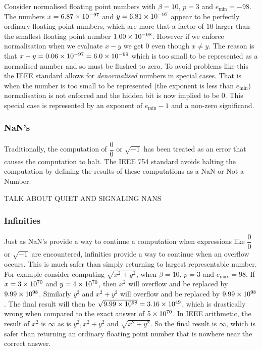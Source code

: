 Consider normalised floating point numbers with $\beta=10$, $p=3$ and
$e_{\text{min}}=-98$. The numbers $x=6.87 \times  10^{-97}  $ and
$y=6.81 \times  10^{-97}  $ appear to be perfectly ordinary floating point numbers,
which are more that a factor of $10$ larger than the smallest floating point
number $1.00 \times  10^{-98}  $. However if we enforce normalisation when we
evaluate $x-y$ we get $0$ even though $x\neq y$. The reason is that
$x-y=0.06 \times  10^{-97}  =6.0 \times  10^{-99}  $ which is too small to be represented as
a normalised number and so must be flushed to zero. To avoid problems like
this the IEEE standard allows for \emph{denormalised} numbers in special
cases. That is when the number is too small to be represented (\ie the
exponent is less than $e_{\text{min}}$) normalisation is not enforced and the
hidden bit is now implied to be $0$. This special case is represented by an
exponent of $e_{\text{min}}-1$ and a non-zero significand.

\subsubsection{NaN's}

Traditionally, the computation of $\dfrac{0}{0}$ or $\sqrt{-1}$ has been
treated as an error that causes the computation to halt. The IEEE 754 standard
avoids halting the computation by defining the results of these computations as
a NaN or Not a Number.

TALK ABOUT QUIET AND SIGNALING NANS

\subsubsection{Infinities}

Just as NaN's provide a way to continue a computation when expressions like
$\dfrac{0}{0}$ or $\sqrt{-1}$ are encountered, infinities provide a way to
continue when an overflow occurs. This is much safer than simply returning to
largest representable number. For example consider computing
$\sqrt{x^{2}+y^{2}}$, when $\beta=10$, $p=3$ and $e_{\text{max}}=98$. If
$x=3 \times  10^{70}  $ and $y=4 \times  10^{70}  $, then $x^{2}$ will overflow and be
replaced by $9.99 \times  10^{98}  $. Similarly $y^{2}$ and $x^{2}+y^{2}$ will
overflow and be replaced by $9.99 \times  10^{98}  $. The final result will then be
$\sqrt{9.99 \times  10^{98}  }=3.16 \times  10^{49}  $, which is drastically wrong when
compared to the exact answer of $5 \times  10^{70}  $. In IEEE arithmetic, the result
of $x^{2}$ is $\infty$ as is $y^{2}, x^{2}+y^{2}$ and $\sqrt{x^{2}+y^{2}}$. So
the final result is $\infty$, which is safer than returning an ordinary
floating point number that is nowhere near the correct answer.

